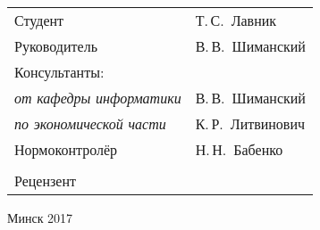\begin{titlepage}
\begin{center}
    \begin{tabular}{ p{}p{} }
      Студент & Т.\,С.~Лавник \\
      Руководитель & В.\,В.~Шиманский \\
      Консультанты: &\\
      \hspace*{3ex}\emph{от кафедры информатики} & В.\,В.~Шиманский \\
      \hspace*{3ex}\emph{по экономической части} & К.\,Р.~Литвинович \\
      Нормоконтролёр & Н.\,Н.~Бабенко\\
      & \\
      Рецензент &
    \end{tabular}

    \vfill
    {\normalsize Минск 2017}
  \end{center}
\end{titlepage}
